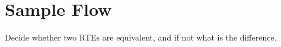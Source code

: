 \section{Sample Flow}

\begin{frame}
  Decide whether two RTEs are equivalent, and if not what is the difference.
\end{frame}
